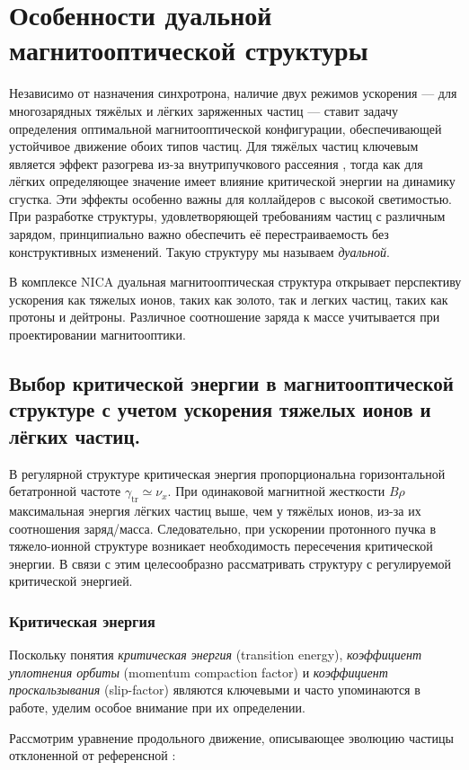 
	\chapter{Особенности дуальной магнитооптической структуры}\label{ch:dual}

\par Независимо от назначения синхротрона, наличие двух режимов ускорения — для многозарядных тяжёлых и лёгких заряженных частиц — ставит задачу определения оптимальной магнитооптической конфигурации, обеспечивающей устойчивое движение обоих типов частиц. Для тяжёлых частиц ключевым является эффект разогрева из-за внутрипучкового рассеяния \cite{trubnikov:cool}, тогда как для лёгких определяющее значение имеет влияние критической энергии на динамику сгустка. Эти эффекты особенно важны для коллайдеров с высокой светимостью. При разработке структуры, удовлетворяющей требованиям частиц с различным зарядом, принципиально важно обеспечить её перестраиваемость без конструктивных изменений. Такую структуру мы называем \textit{дуальной}.

\par В комплексе NICA дуальная магнитооптическая структура открывает перспективу ускорения как тяжелых ионов, таких как золото, так и легких частиц, таких как протоны и дейтроны. Различное соотношение заряда к массе учитывается при проектировании магнитооптики.

	\section{Выбор критической энергии в магнитооптической структуре с учетом ускорения тяжелых ионов и лёгких частиц.}\label{sec:ch:ions_light/transition}

\par В регулярной структуре критическая энергия пропорциональна горизонтальной бетатронной частоте $\gamma_{\text{tr}}\simeq\nu_{x}$. При одинаковой магнитной жесткости $B\rho$ максимальная энергия лёгких частиц выше, чем у тяжёлых ионов, из-за их соотношения заряд/масса. Следовательно, при ускорении протонного пучка в тяжело-ионной структуре возникает необходимость пересечения критической энергии. В связи с этим целесообразно рассматривать структуру с регулируемой критической энергией.

\subsection{Критическая энергия}\label{sec:ch:ions_light/transition/energy}
\par Поскольку понятия \textit{критическая энергия} (transition energy), \textit{коэффициент уплотнения орбиты} (momentum compaction factor) и \textit{коэффициент проскальзывания} (slip-factor) являются ключевыми и часто упоминаются в работе, уделим особое внимание при их определении.
\par Рассмотрим уравнение продольного движение, описывающее эволюцию частицы отклоненной от референсной \cite{lee}:

